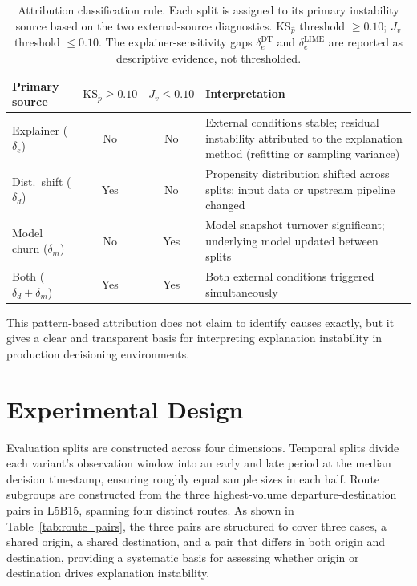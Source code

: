 \documentclass[oneside]{memoir} %
\begin{document}
\begin{table}[ht]
\caption{Attribution classification rule. Each split is assigned to its primary instability source based on the two external-source diagnostics. $\text{KS}_{\hat{p}}$ threshold $\geq 0.10$; $J_v$ threshold $\leq 0.10$. The explainer-sensitivity gaps $\delta_e^{\text{DT}}$ and $\delta_e^{\text{LIME}}$ are reported as descriptive evidence, not thresholded.}
\label{tab:attribution_rule}
\centering
\begin{tabular}{lccp{6cm}}
\toprule
Primary source & $\text{KS}_{\hat{p}} \geq 0.10$ & $J_v \leq 0.10$ & Interpretation \\
\midrule
Explainer ($\delta_e$) & No & No & External conditions stable; residual instability attributed to the explanation method (refitting or sampling variance) \\
Dist.\ shift ($\delta_d$) & Yes & No & Propensity distribution shifted across splits; input data or upstream pipeline changed \\
Model churn ($\delta_m$) & No & Yes & Model snapshot turnover significant; underlying model updated between splits \\
Both ($\delta_d + \delta_m$) & Yes & Yes & Both external conditions triggered simultaneously \\
\bottomrule
\end{tabular}
\end{table}

This pattern-based attribution does not claim to identify causes exactly, but it gives a clear and transparent basis for interpreting explanation instability in production decisioning environments.

\section{Experimental Design} \label{sec:experimental_design}

Evaluation splits are constructed across four dimensions. Temporal splits divide each variant's observation window into an early and late period at the median decision timestamp, ensuring roughly equal sample sizes in each half. Route subgroups are constructed from the three highest-volume departure-destination pairs in L5B15, spanning four distinct routes. As shown in Table~\ref{tab:route_pairs}, the three pairs are structured to cover three cases, a shared origin, a shared destination, and a pair that differs in both origin and destination, providing a systematic basis for assessing whether origin or destination drives explanation instability.
\end{document}
